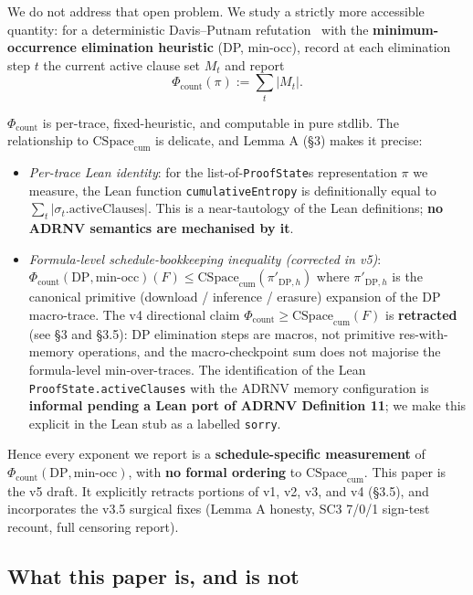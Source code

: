\documentclass[11pt,a4paper]{article}
\theoremstyle{remark}
\begin{document}
We do not address that open problem. We study a strictly more accessible
quantity: for a deterministic Davis--Putnam refutation~\cite{DavisPutnam1960}
with the \textbf{minimum-occurrence elimination heuristic} (DP, min-occ),
record at each elimination step $t$ the current active clause set $M_t$ and
report
\[
\Phi_{\mathrm{count}}(\pi) := \sum_t |M_t|.
\]

$\Phi_{\mathrm{count}}$ is per-trace, fixed-heuristic, and computable in
pure stdlib. The relationship to $\mathrm{CSpace}_{\mathrm{cum}}$ is
delicate, and Lemma A (\S3) makes it precise:

\begin{itemize}
\item \emph{Per-trace Lean identity}: for the list-of-\texttt{ProofState}s
representation $\pi$ we measure, the Lean function \texttt{cumulativeEntropy}
is definitionally equal to $\sum_t |\sigma_t.\mathrm{activeClauses}|$. This
is a near-tautology of the Lean definitions; \textbf{no ADRNV semantics are
mechanised by it}.
\item \emph{Formula-level schedule-bookkeeping inequality (corrected in
v5)}: $\Phi_{\mathrm{count}}(\mathrm{DP}, \mathrm{min\text{-}occ})(F)
\le \mathrm{CSpace}_{\mathrm{cum}}(\pi'_{\mathrm{DP},h})$ where
$\pi'_{\mathrm{DP},h}$ is the canonical primitive (download / inference /
erasure) expansion of the DP macro-trace. The v4 directional claim
$\Phi_{\mathrm{count}} \ge \mathrm{CSpace}_{\mathrm{cum}}(F)$ is
\textbf{retracted} (see \S3 and \S3.5): DP elimination steps are macros,
not primitive res-with-memory operations, and the macro-checkpoint sum
does not majorise the formula-level min-over-traces. The identification of
the Lean \texttt{ProofState.activeClauses} with the ADRNV memory
configuration is \textbf{informal pending a Lean port of ADRNV
Definition 11}; we make this explicit in the Lean stub as a labelled
\texttt{sorry}.
\end{itemize}

Hence every exponent we report is a \textbf{schedule-specific measurement}
of $\Phi_{\mathrm{count}}(\mathrm{DP}, \mathrm{min\text{-}occ})$, with
\textbf{no formal ordering} to $\mathrm{CSpace}_{\mathrm{cum}}$. This paper
is the v5 draft. It explicitly retracts portions of v1, v2, v3, and v4
(\S3.5), and incorporates the v3.5 surgical fixes (Lemma A honesty, SC3
7/0/1 sign-test recount, full censoring report).

\subsection{What this paper is, and is not}
\end{document}
